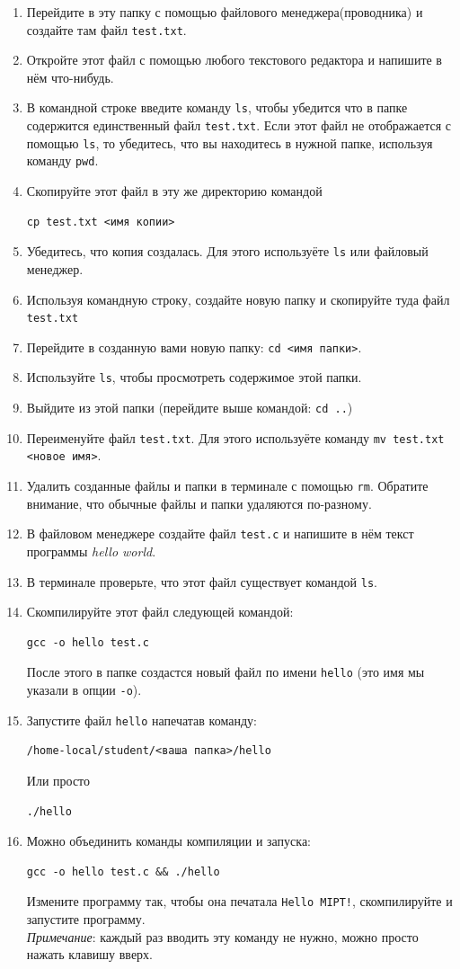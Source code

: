 \documentclass{article}
\begin{document}
\begin{enumerate}
\item Перейдите в эту папку с помощью файлового менеджера(проводника) и создайте там файл \texttt{test.txt}.
\item Откройте этот файл с помощью любого текстового редактора и напишите в нём что-нибудь.
\item В командной строке введите команду \texttt{ls}, чтобы убедится что в папке содержится единственный файл \texttt{test.txt}. Если этот файл не отображается с помощью \texttt{ls}, то убедитесь, что вы находитесь в нужной папке, используя команду \texttt{pwd}.
\item Скопируйте этот файл в эту же директорию командой
\begin{verbatim}
cp test.txt <имя копии>
\end{verbatim}
\item Убедитесь, что копия создалась. Для этого используёте \texttt{ls} или файловый менеджер.
\item Используя командную строку, создайте новую папку и скопируйте туда файл \texttt{test.txt}
\item Перейдите в созданную вами новую папку: \texttt{cd <имя папки>}.
\item Используйте \texttt{ls}, чтобы просмотреть содержимое этой папки.
\item Выйдите из этой папки (перейдите выше командой:  \texttt{cd ..})
\item Переименуйте файл \texttt{test.txt}. Для этого используёте команду \texttt{mv test.txt <новое имя>}.
\item Удалить созданные файлы и папки в терминале с помощью \texttt{rm}. Обратите внимание, что обычные файлы и папки удаляются по-разному.
\item В файловом менеджере создайте файл \texttt{test.c} и напишите в нём текст программы \textit{hello world}.
\item В терминале проверьте, что этот файл существует командой \texttt{ls}.
\item Скомпилируйте этот файл следующей командой:
\begin{verbatim}
gcc -o hello test.c
\end{verbatim}
После этого в папке создастся новый файл по имени \texttt{hello} (это имя мы указали в опции \texttt{-o}).
\item Запустите файл \texttt{hello} напечатав команду:
\begin{verbatim}
/home-local/student/<ваша папка>/hello
\end{verbatim}
Или просто 
\begin{verbatim}
./hello
\end{verbatim}
\item Можно объединить команды компиляции и запуска:
\begin{verbatim}
gcc -o hello test.c && ./hello
\end{verbatim}
Измените программу так, чтобы она печатала \texttt{Hello MIPT!}, скомпилируйте и запустите программу. \\
\textit{Примечание}: каждый раз вводить эту команду не нужно, можно просто нажать клавишу вверх.

\end{enumerate}
\end{document}

